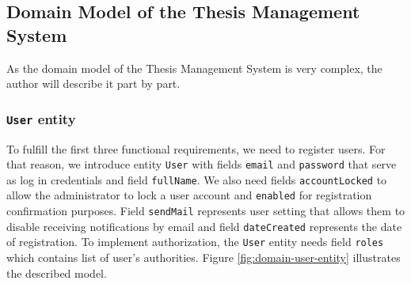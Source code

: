 \subsection{Domain Model of the Thesis Management System}

As the domain model of the Thesis Management System is very complex, the author will describe it part by part.

\subsubsection{\texttt{User} entity}

To fulfill the first three functional requirements, we need to register users. For that reason, we introduce entity \texttt{User} with fields \texttt{email} and \texttt{password} that serve as log in credentials and field \texttt{fullName}. We also need fields \texttt{accountLocked} to allow the administrator to lock a user account and \texttt{enabled} for registration confirmation purposes. Field \texttt{sendMail} represents user setting that allows them to disable receiving notifications by email and field \texttt{dateCreated} represents the date of registration. To implement authorization, the \texttt{User} entity needs field \texttt{roles} which contains list of user's authorities. Figure \ref{fig:domain-user-entity} illustrates the described model.

